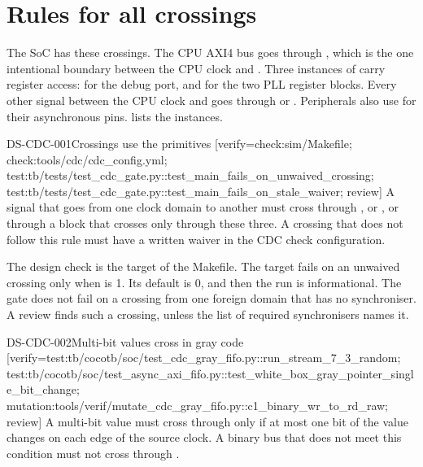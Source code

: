\section{Rules for all crossings}\label{ds:ch:mod-cdc-primitives:family}
The SoC has these crossings. The CPU AXI4 bus goes through , which is the one intentional boundary between the CPU clock and . Three instances of  carry register access:  for the debug port,  and  for the two PLL register blocks. Every other signal between the CPU clock and  goes through  or . Peripherals also use  for their asynchronous pins.  lists the instances.

\begin{requirement}{DS-CDC-001}{Crossings use the primitives}
[verify={check:sim/Makefile; check:tools/cdc/cdc_config.yml; test:tb/tests/test_cdc_gate.py::test_main_fails_on_unwaived_crossing; test:tb/tests/test_cdc_gate.py::test_main_fails_on_stale_waiver; review}]
A signal that goes from one clock domain to another must cross through ,  or , or through a block that crosses only through these three. A crossing that does not follow this rule must have a written waiver in the CDC check configuration.
\end{requirement}
\begin{information}
The design check is the target  of the  Makefile. The target fails on an unwaived crossing only when  is 1. Its default is 0, and then the run is informational. The gate does not fail on a crossing from one foreign domain that has no synchroniser. A review finds such a crossing, unless the list of required synchronisers names it.
\end{information}

\begin{requirement}{DS-CDC-002}{Multi-bit values cross in gray code}
[verify={test:tb/cocotb/soc/test_cdc_gray_fifo.py::run_stream_7_3_random; test:tb/cocotb/soc/test_async_axi_fifo.py::test_white_box_gray_pointer_single_bit_change; mutation:tools/verif/mutate_cdc_gray_fifo.py::c1_binary_wr_to_rd_raw; review}]
A multi-bit value must cross through  only if at most one bit of the value changes on each edge of the source clock. A binary bus that does not meet this condition must not cross through .
\end{requirement}

